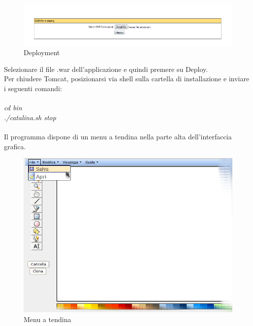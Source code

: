 \begin{figure}[!ht]
\centering
\includegraphics[scale=0.7]{images/DeployTomcat.png}
\caption{Deployment}
\end{figure}
 
Selezionare il file .war dell'applicazione e quindi premere su Deploy.\\
Per chiudere Tomcat, posizionarsi via shell sulla cartella di installazione e inviare i seguenti comandi:\\
\\
\textit{cd bin}\\
\textit{./catalina.sh stop}\\
\\
\newpage
Il programma dispone di un menu a tendina nella parte alta dell'interfaccia grafica.
 
\begin{figure}[!ht]
\centering
\includegraphics[scale=0.4]{images/menu.png}
\caption{Menu a tendina}
\end{figure}
 
